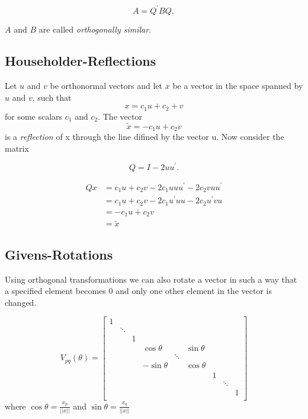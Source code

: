 \documentclass[12pt]{article}
\begin{document}
$$ A = Q^{\prime} B Q, $$

$A$ and $B$ are called \textit{orthogonally similar}.


\subsection{Householder-Reflections}

Let $u$ and $v$ be orthonormal vectors and let $x$ be a vector in the space spanned by $u$ and $v$, such that
$$x = c_1 u + c_2 + v$$ 
for some scalars $c_1$ and $c_2$. The vector 
$$\tilde{x}=-c_1 u + c_2 v$$ 
is a \textit{reflection} of x through the line difined by the vector u. Now consider the matrix

\begin{equation}
Q = I - 2 uu^{\prime}.
\end{equation}


\begin{align*}
Qx &= c_1 u + c_2 v - 2c_1 uuu^{\prime} - 2 c_2 v uu^{\prime} \\
   &= c_1 u + c_2 v - 2c_1 u^{\prime}uu - 2 c_2 u^{\prime} v u \\
   &= -c_1 u + c_2 v\\
   &= \tilde{x}
\end{align*}
\subsection{Givens-Rotations}

Using orthogonal transformations we can also rotate a vector in such a way that a specified element becomes 0 and only one other element in the vector is changed.

\begin{equation}
\label{givens-rotation}
V_{pq}(\theta) = \begin{bmatrix}
                      1 &  &  &  &  &  &  &  &  \\
                       & \ddots &  &  &  &  & &  &  \\
                       &  & 1 &  &  &  &  &  &  \\
                       &  &  & \cos\theta &  & \sin\theta &  &  &  \\
                       &  &  &  & \ddots &  &  &  &  \\
                       &  &  & -\sin\theta &  & \cos\theta &  &  &  \\
                       &  &  &  &  &  & 1 &  &  \\
                       &  &  &  &  &  &  & \ddots &  \\
                       &  &  &  &  &  &  &  & 1 \\                      
                 \end{bmatrix}
\end{equation}
	where $\cos\theta = \frac{x_p}{||x||}$ and $\sin\theta = \frac{x_q}{||x||}$
\end{document}
